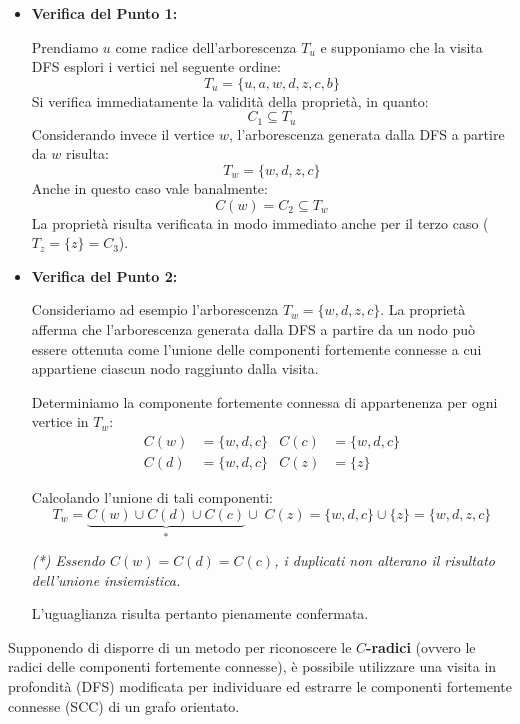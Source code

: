 \documentclass[12pt]{report}
\begin{document}
	\newpage
	\begin{itemize}
		\item \textbf{Verifica del Punto 1:}
		
		Prendiamo $u$ come radice dell'arborescenza $T_u$ e supponiamo che la visita DFS esplori i vertici nel seguente ordine:
		\[
		T_u = \{u, a, w, d, z, c, b\}
		\]
		Si verifica immediatamente la validità della proprietà, in quanto:
		\[
		C_1 \subseteq T_u
		\]
		Considerando invece il vertice $w$, l'arborescenza generata dalla DFS a partire da $w$ risulta:
		\[
		T_w = \{w, d, z, c\}
		\]
		Anche in questo caso vale banalmente:
		\[
		C(w) = C_2 \subseteq T_w
		\]
		La proprietà risulta verificata in modo immediato anche per il terzo caso ($T_z = \{z\} = C_3$).
		
		\item \textbf{Verifica del Punto 2:}
		
		Consideriamo ad esempio l'arborescenza $T_w = \{w, d, z, c\}$. La proprietà afferma che l'arborescenza generata dalla DFS a partire da un nodo può essere ottenuta come l'unione delle componenti fortemente connesse a cui appartiene ciascun nodo raggiunto dalla visita.
		
		Determiniamo la componente fortemente connessa di appartenenza per ogni vertice in $T_w$:
		\begin{align*}
			C(w) &= \{w, d, c\} & C(c) &= \{w, d, c\} \\
			C(d) &= \{w, d, c\} & C(z) &= \{z\}
		\end{align*}
		
		Calcolando l'unione di tali componenti:
		\[
		T_w = \underbrace{C(w) \cup C(d) \cup C(c)}_{*} \cup \; C(z) = \{w, d, c\} \cup \{z\} = \{w, d, z, c\}
		\]
		\begin{small}
			\textit{(*) Essendo $C(w) = C(d) = C(c)$, i duplicati non alterano il risultato dell'unione insiemistica.}
		\end{small}
		
		L'uguaglianza risulta pertanto pienamente confermata.
	\end{itemize}
	
	Supponendo di disporre di un metodo per riconoscere le \textbf{$C$-radici} (ovvero le radici delle componenti fortemente connesse), è possibile utilizzare una visita in profondità (DFS) modificata per individuare ed estrarre le componenti fortemente connesse (SCC) di un grafo orientato.
	
\end{document}
